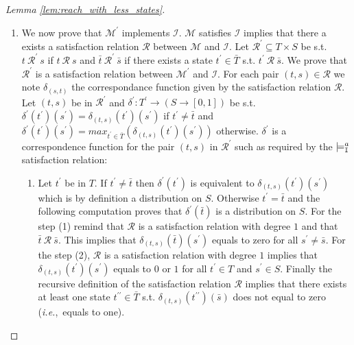\documentclass{llncs}
\newcommand{\satisfactionImc}{\ensuremath{\models^{a}_{\tt{I}}}}
\newcommand{\ie} {{\em i.e.},\ }
\begin{document}
\begin{proof}[Lemma \ref{lem:reach_with_less_states}]
\begin{enumerate}
	\item 
	We now prove that $\mathcal{M}^\prime$ implements $\mathcal{I}$.
	$\mathcal{M}$ satisfies $\mathcal{I}$ implies that there a exists a satisfaction relation $\mathcal{R}$ between $\mathcal{M}$ and $\mathcal{I}$.
	Let $\mathcal{R}^\prime \subseteq T \times S$ be s.t. 
	$t~\mathcal{R}^\prime~s$ if $t~\mathcal{R}~s$
	and  $\bar{t}~\mathcal{R}^\prime~\bar{s}$ if there exists a state 
    $t^\prime \in \bar{T}$ s.t. $t^\prime~\mathcal{R}~\bar{s}$.
	We prove that $\mathcal{R}^\prime$ is a satisfaction relation between $\mathcal{M}^\prime$ and $\mathcal{I}$.
	For each pair $(t,s) \in \mathcal{R}$ we note $\delta_{(s,t)}$ the correspondance function given by the satisfaction relation $\mathcal{R}$. 
	Let $(t,s)$ be in $\mathcal{R}^\prime$ and
	$\delta^\prime : T^\prime \to (S \to [0, 1])$ be s.t.
	$\delta^\prime(t^\prime)(s^\prime) = \delta_{(t,s)}(t^\prime)(s^\prime)$ if $t^\prime \neq \bar{t}$ and 
	$\delta^\prime(t^\prime)(s^\prime) = max_{t^\prime \in \bar{T}}(\delta_{(t,s)}(t^\prime)(s^\prime))$ otherwise.
	$\delta^\prime$ is a correspondence function for the pair $(t,s)$ in $\mathcal{R}^\prime$ such as required by the {\satisfactionImc} satisfaction relation:
	\begin{enumerate}
		\item Let $t^\prime$ be in $T$. If $t^\prime \neq \bar{t}$ 
		then $\delta^\prime(t^\prime)$ is equivalent to $\delta_{(t,s)}(t^\prime)(s^\prime)$
		which is by definition a distribution on $S$. 
		Otherwise $t^\prime = \bar{t}$ and the following computation proves 
		that $\delta^\prime(\bar{t})$ is a distribution on $S$.
		For the step (1) remind 
		that $\mathcal{R}$ is a satisfaction relation with degree $1$ and 
		that $\bar{t}~\mathcal{R}~\bar{s}$.
		This implies that $\delta_{(t,s)}(\bar{t})(s^\prime)$ equals to zero for all $s^\prime \neq \bar{s}$.
		For the step (2), $\mathcal{R}$ is a satisfaction relation with degree $1$ implies 
		that $\delta_{(t,s)}(t^{\prime})(s^\prime)$ equals to $0$ or $1$ for all $t^{\prime} \in T$ and $s^\prime \in S$.
		Finally the recursive definition of the satisfaction relation $\mathcal{R}$
		implies that there exists at least one state $t^{\prime\prime} \in \bar{T}$ s.t. $\delta_{(t,s)}(t^{\prime\prime})(\bar{s})$ does not equal to zero
		(\ie equals to one).
		

\end{enumerate}
\end{enumerate}
\end{proof}
\end{document}
